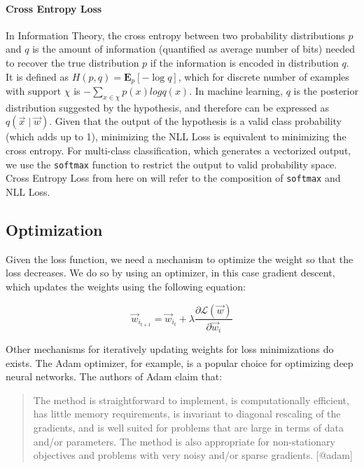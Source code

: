 \documentclass[12pt,a4paper,]{report}
\begin{document}
\paragraph{Cross Entropy Loss}

In Information Theory, the cross entropy between two probability
distributions \(p\) and \(q\) is the amount of information (quantified
as average number of bits) needed to recover the true distribution \(p\)
if the information is encoded in distribution \(q\). It is defined as
\(H(p, q) = \mathbf{E}_p[- \log q]\), which for discrete number of
examples with support \(\chi\) is \(- \sum_{x \in \chi} p(x) log q(x)\).
In machine learning, \(q\) is the posterior distribution suggested by
the hypothesis, and therefore can be expressed as
\(q(\vec{x} \mid \vec{w})\). Given that the output of the hypothesis is
a valid class probability (which adds up to 1), minimizing the NLL Loss
is equivalent to minimizing the cross entropy. For multi-class
classification, which generates a vectorized output, we use the
\texttt{softmax} function to restrict the output to valid probability
space. Cross Entropy Loss from here on will refer to the composition of
\texttt{softmax} and NLL Loss.

\hypertarget{optimization}{%
\subsection{Optimization}\label{optimization}}

Given the loss function, we need a mechanism to optimize the weight so
that the loss decreases. We do so by using an optimizer, in this case
gradient descent, which updates the weights using the following
equation:

\begin{equation}
    \vec{w}_{i_{t+1}} = \vec{w}_{i_{t}} + \lambda \frac{\partial \mathcal{L}(\vec{w})}{\partial \vec{w}_i} \label{eq:opt}
\end{equation}

Other mechanisms for iteratively updating weights for loss minimizations
do exists. The Adam optimizer, for example, is a popular choice for
optimizing deep neural networks. The authors of Adam claim that:

\begin{quote}
The method is straightforward to implement, is computationally
efficient, has little memory requirements, is invariant to diagonal
rescaling of the gradients, and is well suited for problems that are
large in terms of data and/or parameters. The method is also appropriate
for non-stationary objectives and problems with very noisy and/or sparse
gradients. {[}@adam{]}
\end{quote}
\end{document}
